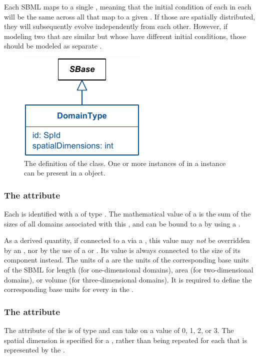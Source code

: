 Each SBML \Compartment maps to a single \DomainType, meaning that the initial condition of each \Species in each \Compartment will be the same across all \Domains that map to a given \DomainType.  If those \Species are spatially distributed, they will subsequently evolve independently from each other.  However, if modeling two \Domains that are similar but whose \Species have different initial conditions, those \Domains should be modeled as separate \DomainTypes.

\begin{figure}[ht]
  \includegraphics{figs/DomainType-uml}
  \caption{The definition of the \DomainType class. One or more instances of \DomainType in a \ListOfDomainTypes instance can be present in a \Geometry object.}
  \label{DomainType-uml}
\end{figure}

\subsubsection{The \fixttspace{} attribute}
Each \DomainType is identified with a  of type .  The mathematical value of a \CompartmentMapping is the sum of the sizes of all domains associated with this \DomainType, and can be bound to a \Parameter by using a \SpatialSymbolReference.

As a derived quantity, if connected to a \Parameter via a \SpatialSymbolReference, this value may \emph{not} be overridden by an \InitialAssignment, nor by the use of a \Rule or \Event.  Its value is always connected to the size of its component \Domains instead.  The units of a \DomainType are the units of the corresponding base units of the SBML \Model for length (for one-dimensional domains), area (for two-dimensional domains), or volume (for three-dimensional domains).  It is required to define the corresponding base units for every \DomainType in the \Model.

\subsubsection{The \fixttspace{} attribute}
The  attribute of the \DomainType is of type  and can take on a value of 0, 1, 2, or 3. The spatial dimension is specified for a \DomainType, rather than being repeated for each \Domain that is represented by the \DomainType.

